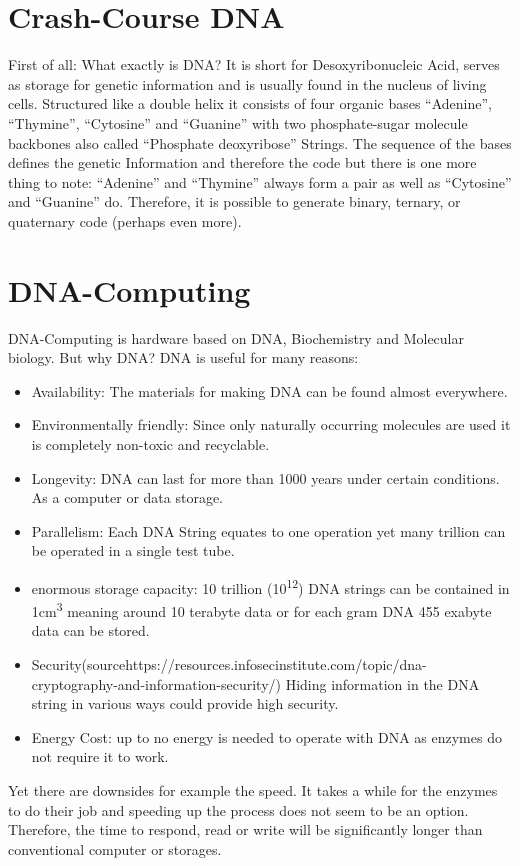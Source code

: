 \documentclass[conference]{IEEEtran}
\begin{document}
\section{Crash-Course DNA}
First of all: What exactly is DNA?
It is short for Desoxyribonucleic Acid, serves as storage for genetic information and is usually found in the nucleus of living cells. 
Structured like a double helix it consists of four organic bases “Adenine”, “Thymine”, “Cytosine” and “Guanine” with two phosphate-sugar molecule backbones also called “Phosphate deoxyribose” Strings. 
The sequence of the bases defines the genetic Information and therefore the code but there is one more thing to note: “Adenine” and “Thymine” always form a pair as well as “Cytosine” and “Guanine” do. Therefore, it is possible to generate binary, ternary, or quaternary code (perhaps even more). 


\section{DNA-Computing}
DNA-Computing is hardware based on DNA, Biochemistry and Molecular biology. But why DNA? DNA is useful for many reasons:

\begin{itemize}
\item Availability: The materials for making DNA can be found almost everywhere.
\item Environmentally friendly: Since only naturally occurring molecules are used it is completely non-toxic and recyclable.
\item Longevity: DNA can last for more than 1000 years under certain conditions. As a computer or data storage.
\item Parallelism: Each DNA String equates to one operation yet many trillion can be operated in a single test tube. 
\item enormous storage capacity: 10 trillion (10\textsuperscript{12}) DNA strings can be contained in 1cm\textsuperscript{3} meaning around 10 terabyte data or for each gram DNA 455 exabyte data can be stored.
\item Security(sourcehttps://resources.infosecinstitute.com/topic/dna-cryptography-and-information-security/) Hiding information in the DNA string in various ways could provide high security.
\item Energy Cost: up to no energy is needed to operate with DNA as enzymes do not require it to work.
\end{itemize}
Yet there are downsides for example the speed. It takes a while for the enzymes to do their job and speeding up the process does not seem to be an option. Therefore, the time to respond, read or write will be significantly longer than conventional computer or storages.
\end{document}

